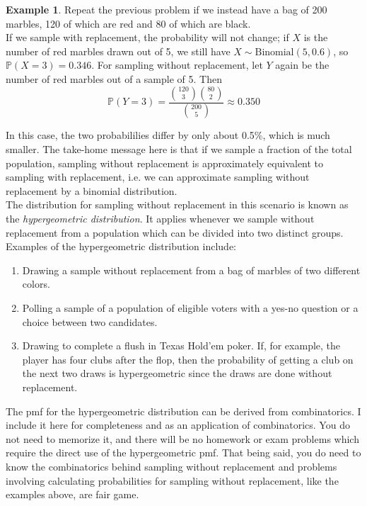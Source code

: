 \documentclass[12pt]{article}
\theoremstyle{definition}
\newtheorem*{example}{Example}
\theoremstyle{remark}
\def\P{{\mathbb P}}
\begin{document}
\begin{example}Repeat the previous problem if we instead have a bag of 200 marbles, 120 of which are red and 80 of which are black.\\

If we sample with replacement, the probability will not change; if $X$ is the number of red marbles drawn out of 5, we still have $X \sim \text{Binomial}(5, 0.6)$, so $\P(X = 3) = 0.346$. For sampling without replacement, let $Y$ again be the number of red marbles out of a sample of 5. Then
\[
\P(Y = 3) = \frac{ \binom{120}{3}\binom{80}{2}}{\binom{200}{5}} \approx 0.350
\]
\end{example}

In this case, the two probabililies differ by only about 0.5\%, which is much smaller. The take-home message here is that if we sample a fraction of the total population, sampling without replacement is approximately equivalent to sampling with replacement, i.e. we can approximate sampling without replacement by a binomial distribution.\\

The distribution for sampling without replacement in this scenario is known as the \emph{hypergeometric distribution}. It applies whenever we sample without replacement from a population which can be divided into two distinct groups. Examples of the hypergeometric distribution include:
\begin{enumerate}
\item Drawing a sample without replacement from a bag of marbles of two different colors.
\item Polling a sample of a population of eligible voters with a yes-no question or a choice between two candidates.
\item Drawing to complete a flush in Texas Hold'em poker. If, for example, the player has four clubs after the flop, then the probability of getting a club on the next two draws is hypergeometric since the draws are done without replacement.
\end{enumerate}

The pmf for the hypergeometric distribution can be derived from combinatorics. I include it here for completeness and as an application of combinatorics. You do not need to memorize it, and there will be no homework or exam problems which require the direct use of the hypergeometric pmf. That being said, you do need to know the combinatorics behind sampling without replacement and problems involving calculating probabilities for sampling without replacement, like the examples above, are fair game.\\
\end{document}
